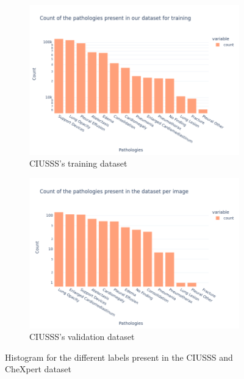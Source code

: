\documentclass[11pt]{article}
\begin{document}
\begin{figure}[h]
     \begin{subfigure}[b]{0.45\linewidth}
         \centering
         \includegraphics[width=\linewidth]{plots/histogram_chexpert_train}
         \caption{CIUSSS's training dataset}
         \vspace{4ex}
         \label{fig:histogram_chexpert_train}
     \end{subfigure}
     \hfill
     \begin{subfigure}[b]{0.45\linewidth}
         \centering
         \includegraphics[width=\linewidth]{plots/histogram_chexpert_valid}
         \caption{CIUSSS's validation dataset}
         \vspace{4ex}
         \label{fig:histogram_chexpert_valid}
     \end{subfigure}

     \caption{Histogram for the different labels present in the CIUSSS and CheXpert dataset}

\end{figure}
\end{document}
